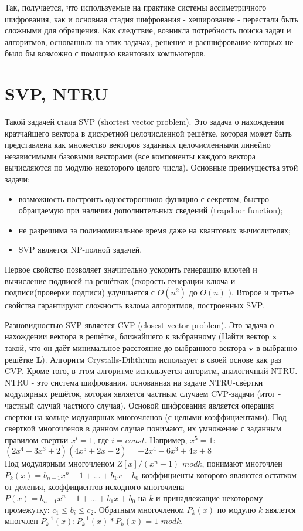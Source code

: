\documentclass{article}
\begin{document}
	Так, получается, что используемые на практике системы ассиметричного шифрования, как и основная стадия шифрования - хеширование - перестали быть сложными для обращения. Как следствие, возникла потребность поиска задач и алгоритмов, основанных на этих задачах, решение и расшифрование которых не было бы возможно с помощью квантовых компьютеров.
	
	\section{
			SVP, NTRU
	}
	Такой задачей стала SVP (shortest vector problem). Это задача о нахождении кратчайшего вектора в дискретной целочисленной решётке, которая может быть представлена как множество векторов заданных целочисленными линейно независимыми базовыми векторами (все компоненты каждого вектора вычисляются по модулю некоторого целого числа). Основные преимущества этой задачи:
	\begin{itemize}
		\item возможность построить одностороннюю функцию с секретом, быстро обращаемую при наличии дополнительных сведений (trapdoor function);
		\item не разрешима за полиноминальное время даже на квантовых вычислителях;
		\item SVP является NP-полной задачей.
	\end{itemize}

	Первое свойство позволяет значительно ускорить генерацию ключей и вычисление подписей на решётках (скорость генерации ключа и подписи(проверки подписи) улучшается с $O(n^2)$ до $O(n)$ ). Второе и третье свойства гарантируют сложность взлома алгоритмов, построенных SVP.
	
	Разновидностью SVP является CVP (closest vector problem). Это задача о нахождении вектора в решётке, ближайшего к выбранному (Найти вектор $\boldsymbol{x}$ такой, что он даёт  минимальное расстояние до выбранного вектора $\boldsymbol{v}$ в выбранно решётке $\boldsymbol{L}$).
	Алгоритм Crystalls-Dilithium использует в своей основе как раз CVP. Кроме того, в этом алгоритме используется алгоритм, аналогичный NTRU.\\
	
	NTRU - это система шифрования, основанная на задаче NTRU-свёртки модулярных решёток, которая является частным случаем CVP-задачи (итог - частный случай частного случая). Основой шифрования является операция свертки на кольце модулярных многочленов (с целыми коэффициентами). Под сверткой многочленов в данном случае понимают, их умножение с заданным правилом свертки $x^i=1$, где $i=const$. Например, $x^5=1$:
	$(2x^4-3x^3+2)(4x^5+2x-2)=-2x^4-6x^3+4x+8$\\
	Под модулярным многочленом $Z[x]/(x^n-1)$ $modk$, понимают многочлен $P_{k}(x)=b_{n-1}x^n-1+...+b_{1}x+b_{0}$ коэффициенты которого являются остатком
	от деления, коэффициентов исходного многочлена \\
	$P(x)=b_{n-1}x^n-1+...+b_{1}x+b_{0}$ на $k$ и принадлежащие некоторому промежутку: $c_{1} \leq b_{i} \leq c_{2}$. Обратным многочленом $P_{k}(x)$ по модулю $k$ явялется многчлен $P_{k}^{-1}(x) : P_{k}^{-1}(x) * P_{k}(x) = 1$ $modk$.
	
\end{document}

